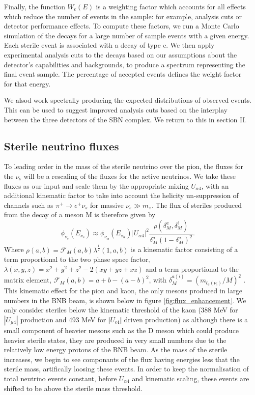 \documentclass[11pt, a4paper]{article}
\begin{document}
%
Finally, the function $W_\text{c}(E)$ is a weighting factor which accounts for
all effects which reduce the number of events in the sample: for example,
analysis cuts or detector performance effects.
%
To compute these factors, we run a Monte Carlo simulation of the decays for a
large number of sample events with a given energy. Each sterile event is
associated with a decay of type $\text{c}$. We then apply experimental analysis
cuts to the decays based on our assumptions about the detector's capabilities
and backgrounds, to produce a spectrum representing the final event sample. The
percentage of accepted events defines the weight factor for that energy.

We alsod work spectrally producing the expected distributions of observed
events. This can be used to suggest improved analysis cuts based on the
interplay between the three detectors of the SBN complex. We return to this in
section II.

\subsection{Sterile neutrino fluxes}

To leading order in the mass of the sterile neutrino over the pion, the fluxes
for the $\nu_\text{s}$ will be a rescaling of the fluxes for the active
neutrinos.  We take these fluxes as our input and scale them by the appropriate mixing $U_{\alpha 4}$, with an additional kinematic factor to take into account the helicity un-suppression of channels such as $\pi^+ \rightarrow e^+\nu_s$ for massive $\nu_s \gg m_e$. The flux of steriles produced from the decay of a meson M is therefore given by
\[
	\phi_{\nu_s}(E_{\nu_s}) \approx \phi_{\nu_\alpha} (E_{\nu_\alpha})\vert U_{\alpha 4}\vert^2 \frac{\rho\left( \delta_M^a , \delta_M^i \right)}{\delta_M^a \left(1- \delta_M^a\right)^2}.
\]
Where $\rho(a,b)=\mathcal{F}_M(a,b) \lambda^{\frac{1}{2}}(1,a,b)$ is a kinematic factor consisting of a term proportional to the two phase space factor, $\lambda(x,y,z)=x^2+y^2+z^2-2(x y+yz+x z)$ and a term proportional to the matrix element, $\mathcal{F}_M(a,b)= a+b -\left(a-b\right)^2$, with $\delta_M^{a(i)}=(m_{l_a(\nu_i)}/M)^2$ \cite{PhysRevD.24.1232}. This kinematic effect for the pion and kaon, the only mesons produced in large numbers in the BNB beam, is shown below in figure \ref{fig:flux_enhancement}. We only consider steriles below the kinematic threshold of the kaon (388 MeV for $|U_{\mu4}|$ production and 493 MeV for $|U_{e4}|$ driven production) as although there is a small component of heavier mesons such as the D meson which could produce heavier sterile states, they are produced in very small numbers due to the relatively low energy protons of the BNB beam. As the mass of the sterile increases, we begin to see componants of the flux having energies less that the sterile mass, artifically loosing these events. In order to keep the normalisation of total neutrino events constant, before $U_{\alpha 4}$ and kinematic scaling, these events are shifted to be above the sterile mass threshold. \\
\end{document}
